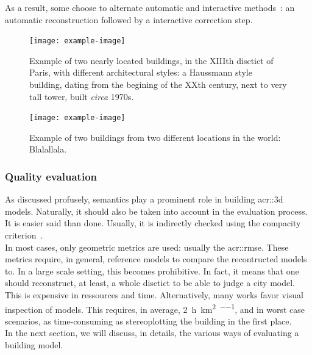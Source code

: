             As a result, some choose to alternate automatic and interactive methods~\parencite{musialski2013survey}: an automatic reconstruction followed by a interactive correction step.
            \begin{figure}[htpb]
                \centering
                \texttt{[image: example-image]}            
                \caption{
                    \label{fig::xiiith_paris_haussmann_tower} Example of two nearly located buildings, in the XIIIth disctict of Paris, with different architectural styles:
                    a Haussmann style building, dating from the begining of the XXth century, next to very tall tower, built \textit{circa} 1970s.
                }
            \end{figure}
            \begin{figure}[htpb]
                \centering
                \texttt{[image: example-image]}            
                \caption{
                    \label{fig::different_regions} Example of two buildings from two different locations in the world:
                    Blalallala.
                }
            \end{figure}
        
        \subsubsection{Quality evaluation}
            As discussed profusely, semantics play a prominent role in building \gls{acr::3d} models.
            Naturally, it should also be taken into account in the evaluation process.
            It is easier said than done.
            Usually, it is indirectly checked using the compacity criterion~\parencite{lafarge_ijcv12}.\\
            In most cases, only geometric metrics are used: usually the \gls{acr::rmse}.
            These metrics require, in general, reference models to compare the recontructed models to.
            In a large scale setting, this becomes prohibitive.
            In fact, it means that one should reconstruct, at least, a whole disctict to be able to judge a city model.
            This is expensive in ressources and time.
            Alternatively, many works favor visual inspection of models.
            This requires, in average, \SI[per-mode=repeated-symbol]{2}{\hour\per\km\squared\per\expert}, and in worst case scenarios, as time-consuming  as stereoplotting the building in the first place.\\
            In the next section, we will discuss, in details, the various ways of evaluating a building model.

